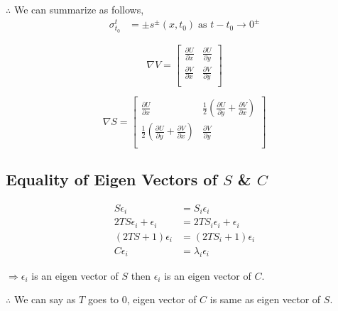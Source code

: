 \documentclass[../report.tex]{subfiles}
\begin{document}
\(\therefore\) We can summarize as follows,
\begin{equation}
  \begin{aligned}
    \sigma_{t_0}^t &= \pm s^\pm (x, t_0)\; \text{as } t - t_0 \rightarrow 0^\pm
  \end{aligned}
\end{equation}

\begin{equation}
  \nabla V = \begin{bmatrix}
    \frac{\partial U}{\partial x} & \frac{\partial U}{\partial y} \\[12pt]
    \frac{\partial V}{\partial x} & \frac{\partial V}{\partial y} \\
  \end{bmatrix}
\end{equation}

\begin{equation}
  \nabla S = \begin{bmatrix}
    \frac{\partial U}{\partial x} & \frac{1}{2} (\frac{\partial U}{\partial y} + \frac{\partial V}{\partial x}) \\[12pt]
    \frac{1}{2} (\frac{\partial U}{\partial y} + \frac{\partial V}{\partial x}) & \frac{\partial V}{\partial y} \\
  \end{bmatrix}
\end{equation}

\subsection{Equality of Eigen Vectors of \(S\) \& \(C\)}
\begin{equation}
  \begin{aligned}
    S\epsilon_i &= S_i\epsilon_i \\
    2TS\epsilon_i + \epsilon_i &= 2TS_i\epsilon_i + \epsilon_i \\
    (2TS + 1)\epsilon_i &= (2TS_i + 1)\epsilon_i \\
    C\epsilon_i &= \lambda_i\epsilon_i
  \end{aligned}
\end{equation}

\(\Rightarrow \epsilon_i\) is an eigen vector of \(S\) then \(\epsilon_i\) is an eigen vector of \(C\).

\(\therefore\) We can say as \(T\) goes to 0, eigen vector of \(C\) is same as eigen vector of \(S\).
\end{document}
